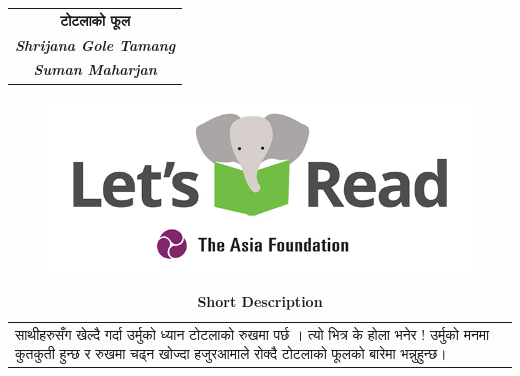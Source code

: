 \documentclass[
  letterpaper,
  DIV=11,
  numbers=noendperiod,
  paper=6in:9in,
  pagesize=pdftex,
  headinclude=on,
  footinclude=on,
  12pt]{scrreprt}
\begin{document}
\begin{longtable}[]{@{}c@{}}
\toprule\noalign{}
\endhead
\bottomrule\noalign{}
\endlastfoot
\textbf{टोटलाको फूल} \\
\textbf{\emph{Shrijana Gole Tamang}} \\
\textbf{\emph{Suman Maharjan}} \\
\end{longtable}

\begin{figure}[H]

{\centering \includegraphics{images/letsread_asf.jpg}

}

\end{figure}

\begin{longtable}[]{@{}
  >{\raggedright\arraybackslash}p{}@{}}
\caption{\textbf{Short Description}}\tabularnewline
\toprule\noalign{}
\endfirsthead
\endhead
\bottomrule\noalign{}
\endlastfoot
साथीहरुसँग खेल्दै गर्दा उर्मुको ध्यान टोटलाको रुखमा पर्छ । त्यो भित्र के होला भनेर !
उर्मुको मनमा कुतकुती हुन्छ र रुखमा चढ्न खोज्दा हजुरआमाले रोक्दै टोटलाको फूलको बारेमा
भन्नुहुन्छ। \\
\end{longtable}


\hypertarget{section}{%
\chapter{}\label{section}}
\end{document}
